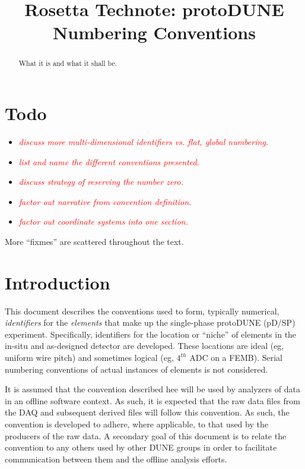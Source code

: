 \documentclass[letterpaper,twoside,onecolumn,article]{memoir}
\title{Rosetta Technote: protoDUNE Numbering Conventions}
\date{}
\newcommand{\fixme}[1]{\textcolor{red}{\textit{#1}}}
\newcommand{\pD}{pD/SP\xspace}
\begin{document}
\maketitle

\begin{abstract}
  What it is and what it shall be.
\end{abstract}
\clearpage

\tableofcontents
\clearpage



\section{Todo}
\begin{itemize}
\item \fixme{discuss more multi-dimensional identifiers vs. flat, global numbering.}
\item \fixme{list and name the different conventions presented.}
\item \fixme{discuss strategy of reserving the number zero.}
\item \fixme{factor out narrative from convention definition.}
\item \fixme{factor out coordinate systems into one section.} 
\end{itemize}

More ``fixmes'' are scattered throughout the text.

\section{Introduction}

This document describes the conventions used to form, typically
numerical, \textit{identifiers} for the \textit{elements} that make up
the single-phase protoDUNE (\pD) experiment.  Specifically, identifiers
for the location or ``niche'' of elements in the in-situ and
as-designed detector are developed.  These locations are ideal (eg,
uniform wire pitch) and sometimes logical (eg, $4^{th}$ ADC on a
FEMB).  Serial numbering conventions of actual instances of elements
is not considered.

It is assumed that the convention described hee will be used by
analyzers of data in an offline software context.  As such, it is
expected that the raw data files from the DAQ and subsequent derived
files will follow this convention.  As such, the convention is
developed to adhere, where applicable, to that used by the producers
of the raw data.  A secondary goal of this document is to relate the
convention to any others used by other DUNE groups in order to
facilitate communication between them and the offline analysis
efforts.
\end{document}
